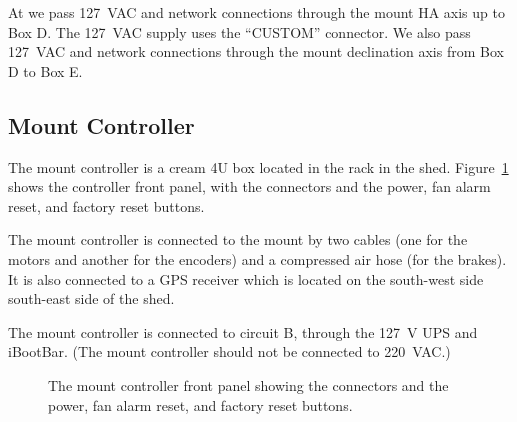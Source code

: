\ifddoti
At {\projectname} we pass 127~VAC and network connections through the mount HA axis up to Box D. The 127~VAC supply uses the “CUSTOM” connector. We also pass 127~VAC and network connections through the mount declination axis from Box D to Box E.
\fi

\subsection{Mount Controller}

The mount controller is a cream 4U box located in the rack in the shed. 
Figure~\ref{figure:mount-controller-panel} shows the controller front panel, with the connectors and the power, fan alarm reset, and factory reset buttons.

The mount controller is connected to the mount by two cables (one for the motors and another for the encoders) and a compressed air hose (for the brakes). It is also connected to a GPS receiver which is located on the
\ifcoatli
south-west side
\fi
\ifddoti
south-east side
\fi
of the shed.

The mount controller is connected to circuit B, through the 127~V UPS and iBootBar. (The mount controller should not be connected to 220~VAC.)

\begin{figure}
\begin{center}
\end{center}
\caption{The mount controller front panel showing the connectors and the power, fan alarm reset, and factory reset buttons.}
\label{figure:mount-controller-panel}
\end{figure}

